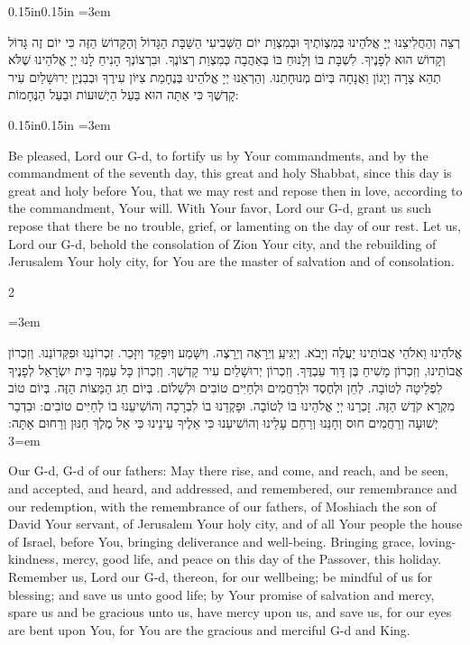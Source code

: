 \documentclass[11pt, openany]{book}
\newenvironment{hebrewblock}{%
  \par\vspace{4pt}
  \begin{adjustwidth}{0.15in}{0.15in}
  \begingroup
  \RTL
  \hebrewfont\large
  \setstretch{1.4}
  \emergencystretch=3em
  \tolerance=9999
  \parindent=0pt\relax
}{%
  \endRTL
  \endgroup
  \end{adjustwidth}
  \par\vspace{2pt}
}
\newenvironment{englishblock}{%
  \par\vspace{2pt}
  \begin{adjustwidth}{0.15in}{0.15in}
  \setstretch{1.4}
  \emergencystretch=3em
  \tolerance=9999
  \normalsize
}{%
  \end{adjustwidth}
  \par\vspace{3pt}
}
\newenvironment{bilingual}{%
  \par\vspace{4pt}%
  \begin{paracol}{2}%
}{%
  \end{paracol}%
  \par\vspace{2pt}%
}
\newenvironment{hebrewcol}{%
  \switchcolumn[1]%
  \begingroup
  \RTL
  \hebrewfont\large
  \setstretch{1.4}%
  \emergencystretch=3em
  \tolerance=9999
  \parindent=0pt\relax
}{%
  \endRTL
  \endgroup
}
\newenvironment{englishcol}{%
  \switchcolumn[0]%
  \begingroup
  \setstretch{1.4}%
  \emergencystretch=3em
  \tolerance=9999
  \normalsize
  \rightskip=0.12in\relax
}{%
  \endgroup
}
\newenvironment{shabbatadd}{%
  \par\vspace{3pt}
  \begin{tcolorbox}[
    enhanced,
    breakable,
    colback=sederblue!6,
    colframe=sederblue!20,
    boxrule=1pt,
    left=18pt,
    right=18pt,
    top=6pt,
    bottom=6pt,
    arc=6pt,
    outer arc=6pt,
    before upper={{\kidsinstructionfont\small\textcolor{sederblue}{\textit{On Shabbat add:}}}\par\vspace{2pt}\normalfont},
  ]
}{%
  \end{tcolorbox}
  \par\vspace{3pt}
}
\begin{document}
\begin{shabbatadd}

\begin{hebrewblock}
רְצֵה וְהַחֲלִיצֵנוּ יְיָ אֱלֹהֵינוּ בְּמִצְוֹתֶיךָ וּבְמִצְוַת יוֹם הַשְּׁבִיעִי הַשַּׁבָּת הַגָּדוֹל וְהַקָּדוֹשׂ הַזֶּה כִּי יוֹם זֶה גָּדוֹל וְקָדוֹשׁ הוּא לְפָנֶיךָ. לִשְׁבָּת בּוֹ וְלָנוּחַ בּוֹ בְּאַהֲבָה כְּמִצְוַת רְצוֹנֶךָ. וּבִרְצוֹנְךָ הָנִיחַ לָנוּ יְיָ אֱלֹהֵינוּ שֶׁלֹּא תְהֵא צָרָה וְיָגוֹן וַאֲנָחָה בְּיוֹם מְנוּחָתֵנוּ. וְהַרְאֵנוּ יְיָ אֱלֹהֵינוּ בְּנֶחָמַת צִיּוֹן עִירֶךָ וּבְבִנְיַן יְרוּשָׁלַיִם עִיר קָדְשֶׁךָ כִּי אַתָּה הוּא בַּעַל הַיְשׁוּעוֹת וּבַעַל הַנֶּחָמוֹת:
\end{hebrewblock}
\begin{englishblock}
Be pleased, Lord our G-d, to fortify us by Your commandments, and by the commandment of the seventh day, this great and holy Shabbat, since this day is great and holy before You, that we may rest and repose then in love, according to the commandment, Your will. With Your favor, Lord our G-d, grant us such repose that there be no trouble, grief, or lamenting on the day of our rest. Let us, Lord our G-d, behold the consolation of Zion Your city, and the rebuilding of Jerusalem Your holy city, for You are the master of salvation and of consolation.
\end{englishblock}
\end{shabbatadd}
\begin{bilingual}
\begin{hebrewcol}
אֱלֹהֵינוּ וֵאלֹהֵי אֲבוֹתֵינוּ יַעֲלֶה וְיָבֹא. וְיַגִּיעַַ וְיֵרָאֶה וְיֵרָצֶה. וְיִשָּׁמַע וְיִפָּקֵד וְיִזָּכֵר. זִכְרוֹנֵנוּ וּפִקְּדוֹנֵנוּ. וְזִכְרוֹן אֲבוֹתֵינוּ, וְזִכְרוֹן מָשִׁיחַ בֶּן דָּוִד עַבְדֶּךָ. וְזִכְרוֹן יְרוּשָׁלַיִם עִיר קָדְשֶׁךָ. וְזִכְרוֹן כָּל עַמְּךָ בֵּית יִשְׂרָאֵל לְפָנֶיךָ לִפְלֵיטָה לְטוֹבָה. לְחֵן וּלְחֶסֶד וּלְרַחֲמִים וּלְחַיִּים טוֹבִים וּלְשָׁלוֹם. בְּיוֹם חַג הַמַּצּוֹת הַזֶּה. בְּיוֹם טוֹב מִקְרָא קֹדֶשׁ הַזֶּה. זָכְרֵנוּ יְיָ אֱלֹהֵינוּ בּוֹ לְטוֹבָה. וּפָקְדֵנוּ בוֹ לִבְרָכָה וְהוֹשִׁיעֵנוּ בוֹ לְחַיִּים טוֹבִים: וּבִדְבַר יְשׁוּעָה וְרַחֲמִים חוּס וְחָנֵּנוּ וְרַחֵם עָלֵינוּ וְהוֹשִׁיעֵנוּ כִּי אֵלֶיךָ עֵינֵינוּ כִּי אֵל מֶלֶךְ חַנּוּן וְרַחוּם אָתָּה:
\end{hebrewcol}
\begin{englishcol}
Our G-d, G-d of our fathers: May there rise, and come, and reach, and be seen, and accepted, and heard, and addressed, and remembered, our remembrance and our redemption, with the remembrance of our fathers, of Moshiach the son of David Your servant, of Jerusalem Your holy city, and of all Your people the house of Israel, before You, bringing deliverance and well-being. Bringing grace, loving-kindness, mercy, good life, and peace on this day of the Passover, this holiday. Remember us, Lord our G-d, thereon, for our wellbeing; be mindful of us for blessing; and save us unto good life; by Your promise of salvation and mercy, spare us and be gracious unto us, have mercy upon us, and save us, for our eyes are bent upon You, for You are the gracious and merciful G-d and King.
\end{englishcol}
\end{bilingual}
\end{document}
